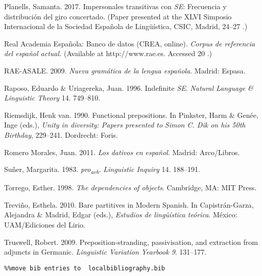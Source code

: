 \documentclass[output=paper]{langsci/langscibook}
\begin{document}
Planells, Samanta. 2017. Impersonales transitivas con \textit{SE}: Frecuencia y distribución del giro concertado. (Paper presented at the XLVI Simposio Internacional de la Sociedad Española de Lingüística, CSIC, Madrid, 24–27 \citealt{January2017}.)

Real Academia Española: Banco de datos (CREA, online). \textit{Corpus de referencia del español actual.} (Available at http://www.rae.es. Accessed 20 \citealt{April2014}.)

RAE-ASALE. 2009. \textit{Nueva gramática de la lengua española}. Madrid: Espasa.

Raposo, Eduardo \& Uriagereka, Juan. 1996. Indefinite \textit{SE}. \textit{Natural Language \& Linguistic Theory} 14. 749–810.

Riemsdijk, Henk van. 1990. Functional prepositions. In Pinkster, Harm \& Genée, Inge (eds.), \textit{Unity in diversity: Papers presented to} \textit{Simon C. Dik on his 50th Birthday}, 229–241. Dordrecht: Foris.

Romero Morales, Juan. 2011. \textit{Los dativos en español}. Madrid: Arco/Libros.

Suñer, Margarita. 1983. \textit{pro\textsubscript{arb}}. \textit{Linguistic Inquiry} 14. 188–191.

Torrego, Esther. 1998. \textit{The dependencies of objects}. Cambridge, MA: MIT Press.

Treviño, Esthela. 2010. Bare partitives in Modern Spanish. In Capistrán-Garza, Alejandra \& Madrid, Edgar (eds.), \textit{Estudios de lingüística teórica}. México: UAM/Ediciones del Lirio.

Truswell, Robert. 2009. Preposition-stranding, passivisation, and extraction from adjuncts in Germanic. \textit{Linguistic Variation Yearbook 9}. 131–177.


\begin{verbatim}%%move bib entries to  localbibliography.bib
\end{verbatim} 

\sloppy
\printbibliography[heading=subbibliography,notkeyword=this] 
\end{document}

